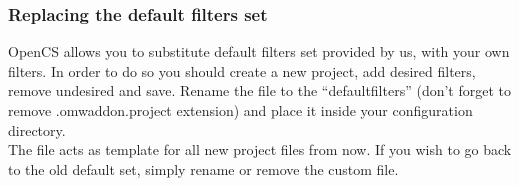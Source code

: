 \subsubsection{Replacing the default filters set}
{OpenCS} allows you to substitute default filters set provided by us, with your own filters. In order to do so you should create a new project, add desired filters, remove undesired and save. Rename the file to the ``defaultfilters'' (don't forget to remove .omwaddon.project extension) and place it inside your configuration directory.\\
The file acts as template for all new project files from now. If you wish to go back to the old default set, simply rename or remove the custom file.